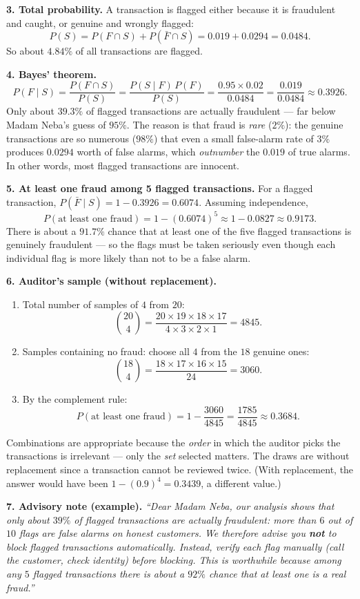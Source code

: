 \documentclass[11pt]{article}
\begin{document}
\textbf{3. Total probability.} A transaction is flagged either because it is fraudulent and caught, or genuine and wrongly flagged:
\[ P(S) = P(F \cap S) + P(\bar{F} \cap S) = 0.019 + 0.0294 = 0.0484. \]
So about $4.84\%$ of all transactions are flagged.

\textbf{4. Bayes' theorem.}
\[ P(F \mid S) = \frac{P(F \cap S)}{P(S)} = \frac{P(S \mid F)\,P(F)}{P(S)} = \frac{0.95 \times 0.02}{0.0484} = \frac{0.019}{0.0484} \approx 0.3926. \]
Only about $39.3\%$ of flagged transactions are actually fraudulent — far below Madam Neba's guess of $95\%$. The reason is that fraud is \emph{rare} ($2\%$): the genuine transactions are so numerous ($98\%$) that even a small false-alarm rate of $3\%$ produces $0.0294$ worth of false alarms, which \emph{outnumber} the $0.019$ of true alarms. In other words, most flagged transactions are innocent.

\textbf{5. At least one fraud among 5 flagged transactions.} For a flagged transaction, $P(\bar{F} \mid S) = 1 - 0.3926 = 0.6074$. Assuming independence,
\[ P(\text{at least one fraud}) = 1 - (0.6074)^5 \approx 1 - 0.0827 \approx 0.9173. \]
There is about a $91.7\%$ chance that at least one of the five flagged transactions is genuinely fraudulent — so the flags must be taken seriously even though each individual flag is more likely than not to be a false alarm.

\textbf{6. Auditor's sample (without replacement).}
\begin{enumerate}
\item Total number of samples of $4$ from $20$:
\[ \binom{20}{4} = \frac{20 \times 19 \times 18 \times 17}{4 \times 3 \times 2 \times 1} = 4845. \]
\item Samples containing no fraud: choose all $4$ from the $18$ genuine ones:
\[ \binom{18}{4} = \frac{18 \times 17 \times 16 \times 15}{24} = 3060. \]
\item By the complement rule:
\[ P(\text{at least one fraud}) = 1 - \frac{3060}{4845} = \frac{1785}{4845} \approx 0.3684. \]
\end{enumerate}
Combinations are appropriate because the \emph{order} in which the auditor picks the transactions is irrelevant — only the \emph{set} selected matters. The draws are without replacement since a transaction cannot be reviewed twice. (With replacement, the answer would have been $1 - (0.9)^4 = 0.3439$, a different value.)

\textbf{7. Advisory note (example).} \emph{``Dear Madam Neba, our analysis shows that only about $39\%$ of flagged transactions are actually fraudulent: more than $6$ out of $10$ flags are false alarms on honest customers. We therefore advise you \textbf{not} to block flagged transactions automatically. Instead, verify each flag manually (call the customer, check identity) before blocking. This is worthwhile because among any $5$ flagged transactions there is about a $92\%$ chance that at least one is a real fraud.''}
\end{document}
